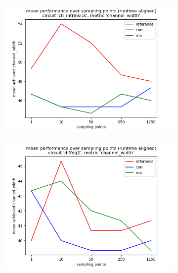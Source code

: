 \begin{figure}[H]
	\centering
	\begin{subfigure}[b]{0.49\linewidth}
		\includegraphics[width=\linewidth]{plots/eval-ch_intrinsics-chan-width-mean-full.png}
	\end{subfigure}
	\begin{subfigure}[b]{0.49\linewidth}
		\includegraphics[width=\linewidth]{plots/eval-diffeq2-chan-width-mean-full.png}
	\end{subfigure}
	\begin{subfigure}[b]{0.49\linewidth}

\end{subfigure}
\end{figure}
